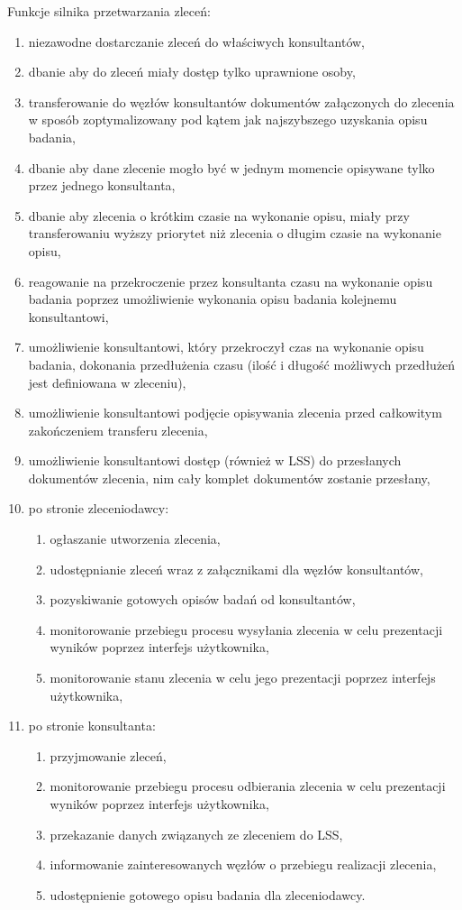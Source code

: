 \documentclass[a4paper]{report}
\begin{document}
Funkcje silnika przetwarzania zleceń:
\begin{enumerate}
  \item niezawodne dostarczanie zleceń do właściwych konsultantów,
  \item dbanie aby do zleceń miały dostęp tylko uprawnione osoby,
  \item transferowanie do węzłów konsultantów dokumentów załączonych do zlecenia w sposób zoptymalizowany pod kątem jak najszybszego uzyskania opisu badania,
  \item dbanie aby dane zlecenie mogło być w jednym momencie opisywane tylko przez jednego konsultanta,
  \item dbanie aby zlecenia o krótkim czasie na wykonanie opisu, miały przy transferowaniu wyższy priorytet niż zlecenia o długim czasie na wykonanie opisu,
  \item reagowanie na przekroczenie przez konsultanta czasu na wykonanie opisu badania poprzez umożliwienie wykonania opisu badania kolejnemu konsultantowi,
  \item umożliwienie konsultantowi, który przekroczył czas na wykonanie opisu badania, dokonania przedłużenia czasu (ilość i długość możliwych przedłużeń jest definiowana w zleceniu),
  \item umożliwienie konsultantowi podjęcie opisywania zlecenia przed całkowitym zakończeniem transferu zlecenia,
  \item umożliwienie konsultantowi dostęp (również w LSS) do przesłanych dokumentów zlecenia, nim cały komplet dokumentów zostanie przesłany,
  \item po stronie zleceniodawcy:
  \begin{enumerate}
    \item ogłaszanie utworzenia zlecenia, 
    \item udostępnianie zleceń wraz z załącznikami dla węzłów konsultantów,
    \item pozyskiwanie gotowych opisów badań od konsultantów,
    \item monitorowanie przebiegu procesu wysyłania zlecenia w celu prezentacji wyników poprzez interfejs użytkownika, 
    \item monitorowanie stanu zlecenia w celu jego prezentacji poprzez interfejs użytkownika,
  \end{enumerate}
  \item po stronie konsultanta:
  \begin{enumerate}
    \item przyjmowanie zleceń,
    \item monitorowanie przebiegu procesu odbierania zlecenia w celu prezentacji wyników poprzez interfejs użytkownika,
    \item przekazanie danych związanych ze zleceniem do LSS,
    \item informowanie zainteresowanych węzłów o przebiegu realizacji zlecenia,
    \item udostępnienie gotowego opisu badania dla zleceniodawcy.
  \end{enumerate}
\end{enumerate}
\end{document}
